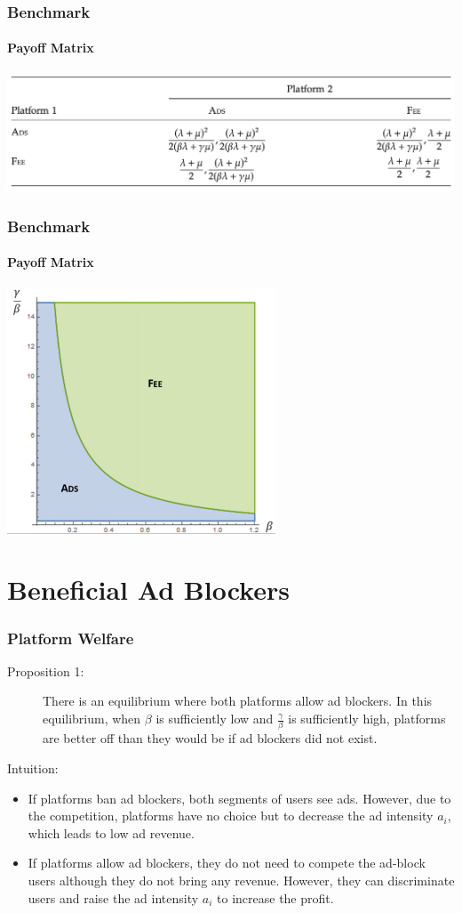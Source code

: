 \documentclass{beamer}
\newcommand{\hl}[1]{\textcolor{myblue}{#1}}
\begin{document}
\begin{frame}
    \frametitle{Benchmark}
    \framesubtitle{Payoff Matrix}
    \centering
    \includegraphics[width=\textwidth]{benchmark}
\end{frame}

\begin{frame}
    \frametitle{Benchmark}
    \framesubtitle{Payoff Matrix}
    \centering
    \includegraphics[width=0.6\textwidth]{benchfig}
\end{frame}


\section{Beneficial Ad Blockers}
\begin{frame}
    \frametitle{Platform Welfare}
    \begin{description}
        \item[Proposition 1:] 
            There is an equilibrium where \hl{both platforms allow ad blockers}. 
            In this equilibrium, when $\beta$ is sufficiently low and 
            $\frac{\gamma}{\beta}$ is sufficiently high, 
            platforms are better off than they would be if ad blockers did not exist.
        \item[Intuition:]
   \end{description}
            \begin{itemize}
                \item If platforms ban ad blockers, both segments of users see ads.
                However, due to the competition, platforms have no choice but to
                decrease the ad intensity $a_i$, which leads to low ad revenue.
                \item If platforms allow ad blockers, \hl{they do not need to compete the
                ad-block users} although they do not bring any revenue. However,
                they can \hl{discriminate users and raise the ad intensity $a_i$}
                to increase the profit.
            \end{itemize}
\end{frame}
\end{document}
